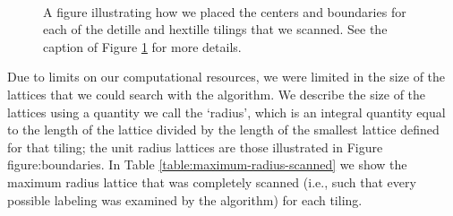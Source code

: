 \documentclass[12pt]{amsbook}
\theoremstyle{plain}
\theoremstyle{definition}
\theoremstyle{remark}
\begin{document}
\begin{figure}
\\
\caption{
\label{figure:boundaries2}
A figure illustrating how we placed the centers and boundaries for each of the detille and hextille tilings that we scanned.  See the caption of Figure \ref{figure:boundaries2} for more details.
}
\end{figure}

Due to limits on our computational resources, we were limited in the size of the lattices that we could search with the algorithm.  We describe the size of the lattices using a quantity we call the `radius', which is an integral quantity equal to the length of the lattice divided by the length of the smallest lattice defined for that tiling;  the unit radius lattices are those illustrated in Figure {figure:boundaries}.  In Table \ref{table:maximum-radius-scanned} we show the maximum radius lattice that was completely scanned (i.e., such that every possible labeling was examined by the algorithm) for each tiling.
\end{document}
